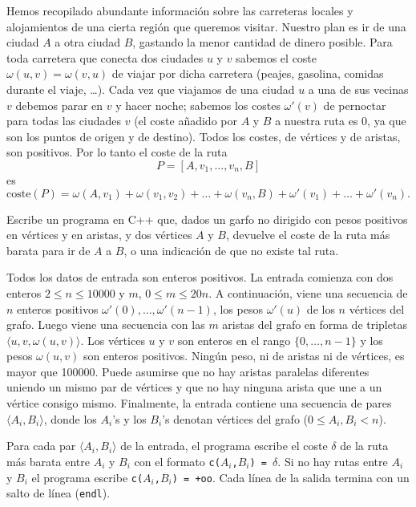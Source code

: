 \Statement
Hemos recopilado abundante información sobre las carreteras locales y
alojamientos de una cierta región que queremos visitar. Nuestro plan
es ir de una ciudad $A$ a otra ciudad $B$, gastando la menor cantidad
de dinero posible. Para toda carretera que conecta dos ciudades $u$ y
$v$ sabemos el coste $\omega(u,v)=\omega(v,u)$ de viajar por dicha
carretera (peajes, gasolina, comidas durante el viaje, \ldots).  Cada
vez que viajamos de una ciudad $u$ a una de sus vecinas $v$ debemos
parar en $v$ y hacer noche; sabemos los costes $\omega'(v)$ de
pernoctar para todas las ciudades $v$ (el coste añadido por $A$ y $B$
a nuestra ruta es 0, ya que son los puntos de origen y de destino).
Todos los costes, de vértices y de aristas, son positivos. Por lo
tanto el coste de la ruta
\[
P = [A, v_1, \ldots, v_n, B]
\]
es
\[
  \text{coste}(P) = \omega(A,v_1) + \omega(v_1,v_2) + \ldots + \omega(v_n,B) 
  + \omega'(v_1)+\ldots+\omega'(v_n).
\]

Escribe un programa en C++ que, dados un garfo no dirigido con pesos
positivos en vértices
y en aristas, y dos vértices $A$ y $B$, devuelve el coste de la ruta más barata para ir de
$A$ a $B$, o una indicación de que no existe tal ruta.

\Input
Todos los datos de entrada son enteros positivos.
La entrada comienza con dos enteros
$2{\le}n{\le}10000$ y $m$, $0{\le}m\le{20n}$.
A continuación, viene una secuencia de $n$ enteros positivos
$\omega'(0), \ldots, \omega'(n-1)$, los pesos $\omega'(u)$ de los $n$ vértices del grafo.
Luego viene una secuencia con las $m$ aristas del grafo en forma de tripletas
${\langle}u,v,\omega(u,v)\rangle$. Los vértices $u$ y $v$ son enteros en el rango
$\{0,\ldots,n-1\}$ y los pesos $\omega(u,v)$ son enteros positivos.
Ningún peso, ni de aristas ni de vértices, es mayor que 100000.
Puede asumirse que no hay aristas paralelas diferentes uniendo un mismo par de vértices
y que no hay ninguna arista que une a un vértice consigo mismo.
Finalmente, la entrada contiene una secuencia de pares
${\langle}A_i, B_i\rangle$, donde los $A_i$'s y los $B_i$'s
denotan vértices del grafo ($0{\le}A_i,B_i<n$).

\Output
Para cada par ${\langle}A_i, B_i\rangle$ de la entrada, el programa escribe el coste $\delta$
de la ruta más barata entre $A_i$ y $B_i$ con el formato \texttt{c($A_i$,$B_i$) = $\delta$}.
Si no hay rutas entre $A_i$ y $B_i$ el programa escribe
\texttt{c($A_i$,$B_i$) = +oo}. Cada línea de la salida termina
con un salto de línea (\texttt{endl}).

\SampleTwoCol
